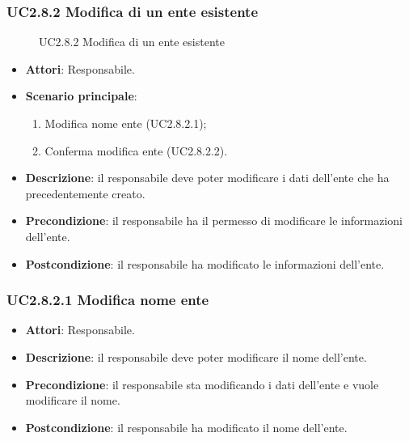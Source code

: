 \subsubsection{UC2.8.2 Modifica di un ente esistente}
\begin{figure}[H]
\centering
\noindent{}
\caption{UC2.8.2 Modifica di un ente esistente}
\end{figure}
\begin{itemize}
\item \textbf{Attori}: Responsabile.
\item \textbf{Scenario principale}:
\begin{enumerate}
\item Modifica nome ente (UC2.8.2.1);
\item Conferma modifica ente (UC2.8.2.2).
\end{enumerate}
\item \textbf{Descrizione}: il responsabile deve poter modificare i dati dell'ente che ha precedentemente creato.
\item \textbf{Precondizione}: il responsabile ha il permesso di modificare le informazioni dell'ente.
\item \textbf{Postcondizione}: il responsabile ha modificato le informazioni dell'ente.
\end{itemize}
\subsubsection{UC2.8.2.1 Modifica nome ente}
\begin{itemize}
\item \textbf{Attori}: Responsabile.
\item \textbf{Descrizione}: il responsabile deve poter modificare il nome dell'ente.
\item \textbf{Precondizione}: il responsabile sta modificando i dati dell'ente e vuole modificare il nome.
\item \textbf{Postcondizione}: il responsabile ha modificato il nome dell'ente.
\end{itemize}
